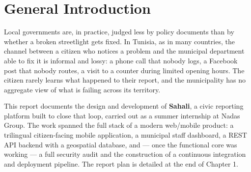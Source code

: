 \documentclass[12pt, a4paper]{report}
\begin{document}
\newpage
\tableofcontents
\listoffigures
\listoftables
\newpage

\chapter*{General Introduction}

Local governments are, in practice, judged less by policy documents than by whether a broken streetlight gets fixed. In Tunisia, as in many countries, the channel between a citizen who notices a problem and the municipal department able to fix it is informal and lossy: a phone call that nobody logs, a Facebook post that nobody routes, a visit to a counter during limited opening hours. The citizen rarely learns what happened to their report, and the municipality has no aggregate view of what is failing across its territory.

This report documents the design and development of \textbf{Sahali}, a civic reporting platform built to close that loop, carried out as a summer internship at Nadas Group. The work spanned the full stack of a modern web/mobile product: a trilingual citizen-facing mobile application, a municipal staff dashboard, a REST API backend with a geospatial database, and --- once the functional core was working --- a full security audit and the construction of a continuous integration and deployment pipeline. The report plan is detailed at the end of Chapter 1.








\appendix



\end{document}
